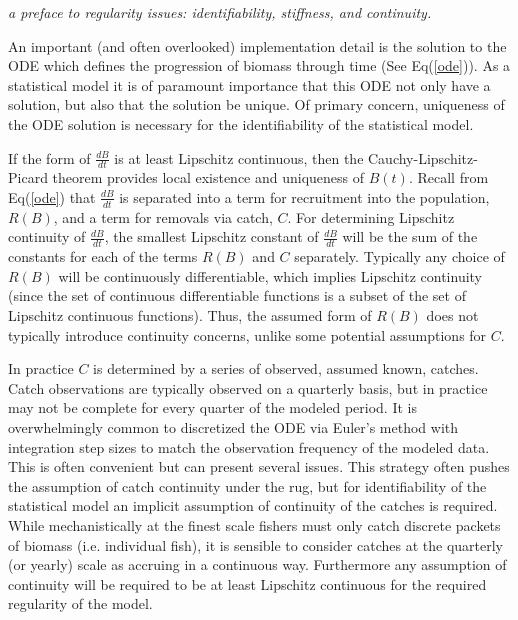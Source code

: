 \documentclass[12pt]{article}
\begin{document}
%
{\color{blue}

\textit{
a preface to regularity issues: identifiability, stiffness, and continuity.
}


%
An important (and often overlooked) implementation detail is the solution to the
ODE which defines the progression of biomass through time (See Eq(\ref{ode})). As
a statistical model it is of paramount importance that this ODE not only have a
solution, but also that the solution be unique. Of primary concern, uniqueness
of the ODE solution is necessary for the identifiability of the statistical model.

%
If the form of $\frac{dB}{dt}$ is at least Lipschitz continuous, then the
Cauchy-Lipschitz-Picard theorem provides local existence and uniqueness of
$B(t)$.%
Recall from Eq(\ref{ode}) that $\frac{dB}{dt}$ is separated into
a term for recruitment into the population, $R(B)$, and a term for removals via
catch, $C$. For determining Lipschitz continuity of $\frac{dB}{dt}$,
the smallest Lipschitz constant of $\frac{dB}{dt}$ will be the sum of the
constants for each of the terms $R(B)$ and $C$ separately. Typically any choice
of $R(B)$ will be continuously differentiable, which implies Lipschitz continuity
(since the set of continuous differentiable functions is a subset of the set of
Lipschitz continuous functions).
Thus, the assumed form of $R(B)$ does not typically introduce continuity concerns,
unlike some potential assumptions for $C$.

%
In practice $C$ is determined by a series of observed, assumed
known, catches. Catch observations are typically observed on a quarterly basis, but
in practice may not be complete for every quarter of the modeled period. It is
overwhelmingly common to discretized the ODE via Euler's method with integration
step sizes to match the observation frequency of the modeled data. This is often
convenient but can present several issues. This strategy often pushes the
assumption of catch continuity under the rug, but for identifiability of the
statistical model an implicit assumption of continuity of the catches is
required. While mechanistically at the finest scale fishers must only catch
discrete packets of biomass (i.e. individual fish), it is sensible to consider
catches at the quarterly (or yearly) scale as accruing in a continuous way.
Furthermore any assumption of continuity will be required to be at least
Lipschitz continuous for the required regularity of the model.

}
\end{document}
